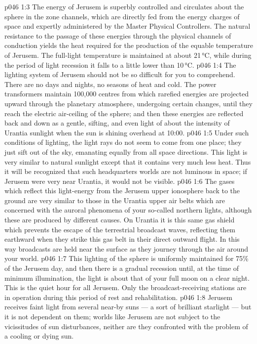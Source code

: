 \vs p046 1:3 \pc The energy of Jerusem is superbly controlled and circulates about the sphere in the zone channels, which are directly fed from the energy charges of space and expertly administered by the Master Physical Controllers. The natural resistance to the passage of these energies through the physical channels of conduction yields the heat required for the production of the equable temperature of Jerusem. The full\hyp{}light temperature is maintained at about 21\,°C, while during the period of light recession it falls to a little lower than 10\,°C.
\vs p046 1:4 \pc The lighting system of Jerusem should not be so difficult for you to comprehend. There are no days and nights, no seasons of heat and cold. The power transformers maintain 100,000 centres from which rarefied energies are projected upward through the planetary atmosphere, undergoing certain changes, until they reach the electric air\hyp{}ceiling of the sphere; and then these energies are reflected back and down as a gentle, sifting, and even light of about the intensity of Urantia sunlight when the sun is shining overhead at 10:00.
\vs p046 1:5 Under such conditions of lighting, the light rays do not seem to come from one place; they just sift out of the sky, emanating equally from all space directions. This light is very similar to natural sunlight except that it contains very much less heat. Thus it will be recognized that such headquarters worlds are not luminous in space; if Jerusem were very near Urantia, it would not be visible.
\vs p046 1:6 The gases which reflect this light\hyp{}energy from the Jerusem upper ionosphere back to the ground are very similar to those in the Urantia upper air belts which are concerned with the auroral phenomena of your so\hyp{}called northern lights, although these are produced by different causes. On Urantia it is this same gas shield which prevents the escape of the terrestrial broadcast waves, reflecting them earthward when they strike this gas belt in their direct outward flight. In this way broadcasts are held near the surface as they journey through the air around your world.
\vs p046 1:7 This lighting of the sphere is uniformly maintained for 75\% of the Jerusem day, and then there is a gradual recession until, at the time of minimum illumination, the light is about that of your full moon on a clear night. This is the quiet hour for all Jerusem. Only the broadcast\hyp{}receiving stations are in operation during this period of rest and rehabilitation.
\vs p046 1:8 \pc Jerusem receives faint light from several near\hyp{}by suns --- a sort of brilliant starlight --- but it is not dependent on them; worlds like Jerusem are not subject to the vicissitudes of sun disturbances, neither are they confronted with the problem of a cooling or dying sun.
